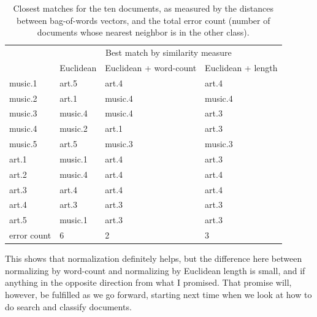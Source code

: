 \documentclass{article}
\begin{document}
\begin{table}[h]
\begin{tabular}{l|lll}
& \multicolumn{3}{c}{Best match by similarity measure}\\
& Euclidean & Euclidean + word-count & Euclidean + length\\
\hline
music.1 & art.5 & art.4 & art.4\\
music.2 & art.1 & music.4 & music.4\\
music.3 & music.4 & music.4 & art.3\\
music.4 & music.2 & art.1 & art.3\\
music.5 & art.5 & music.3 & music.3\\
art.1 & music.1 & art.4 & art.3\\
art.2 & music.4 & art.4 & art.4\\
art.3 & art.4 & art.4 & art.4\\
art.4 & art.3 & art.3 & art.3\\
art.5 & music.1 & art.3 & art.3\\
\hline
error count & 6 & 2 & 3
\end{tabular}
\caption{Closest matches for the ten documents, as measured by the distances
  between bag-of-words vectors, and the total error count (number of documents
  whose nearest neighbor is in the other class).}
\label{table:matches-and-errors}
\end{table}

This shows that normalization definitely helps, but the difference here between
normalizing by word-count and normalizing by Euclidean length is small, and if
anything in the opposite direction from what I promised.  That promise will,
however, be fulfilled as we go forward, starting next time when we look at how
to do search and classify documents.
\end{document}
